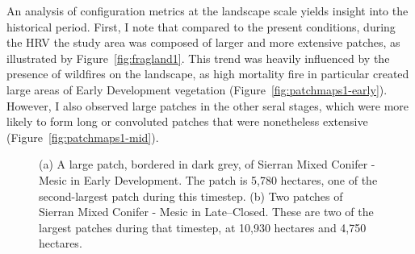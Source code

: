 

An analysis of configuration metrics at the landscape scale yields insight into the historical period. First, I note that compared to the present conditions, during the HRV the study area was composed of larger and more extensive patches, as illustrated by Figure~\ref{fig:fragland1}. This trend was heavily influenced by the presence of wildfires on the landscape, as high mortality fire in particular created large areas of Early Development vegetation (Figure~\ref{fig:patchmaps1-early}). However, I also observed large patches in the other seral stages, which were more likely to form long or convoluted patches that were nonetheless extensive (Figure~\ref{fig:patchmaps1-mid}).

\begin{figure}[!htbp]
  \centering
  \caption{(a) A large patch, bordered in dark grey, of Sierran Mixed Conifer - Mesic in Early Development. The patch is 5,780 hectares, one of the second-largest patch during this timestep. (b) Two patches of Sierran Mixed Conifer - Mesic in Late--Closed. These are two of the largest patches during that timestep, at 10,930 hectares and 4,750 hectares.} 
  \label{fig:patchmaps1}
\end{figure}


